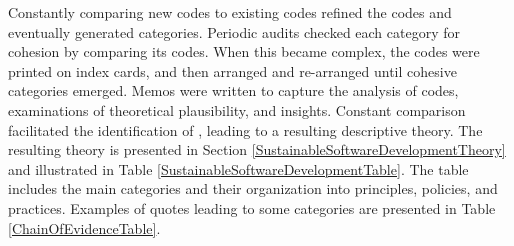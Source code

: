 

Constantly comparing new codes to existing codes refined the codes and eventually generated categories. Periodic audits checked each category for cohesion by comparing its codes. When this became complex, the codes were printed on index cards, and then arranged and re-arranged until cohesive categories emerged. Memos were written to capture the analysis of codes, examinations of theoretical plausibility, and insights. 
Constant comparison facilitated the identification of  \cite{GlaserBasics}, leading to a resulting descriptive theory. The resulting theory is presented in Section \ref{SustainableSoftwareDevelopmentTheory} and illustrated in Table \ref{SustainableSoftwareDevelopmentTable}. The table includes the main categories and their organization into principles, policies, and practices. Examples of quotes leading to some categories are presented in Table \ref{ChainOfEvidenceTable}.

